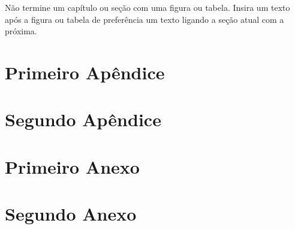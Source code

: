 \documentclass[
    12pt,				       %
    openright,			       %
    oneside,			       %
    a4paper,			       %
    chapter=TITLE,             %
    sumario=tradicional,       %
    english,			        %
    brazil, 				    %
 ]{abntex2}
\begin{document}
Não termine um capítulo ou seção com uma figura ou tabela. Insira um texto após a figura ou tabela de preferência um texto ligando a seção atual com a próxima.


\postextual


\thispagestyle{empty}




\begin{apendicesenv} \thispagestyle{empty}
    \partapendices %

    \chapter{Primeiro Apêndice} \thispagestyle{empty}

    \chapter{Segundo Apêndice} \thispagestyle{empty}
\end{apendicesenv}

\begin{anexosenv}
    \partanexos %

    \chapter{Primeiro Anexo} \thispagestyle{empty}

    \chapter{Segundo Anexo} \thispagestyle{empty}
\end{anexosenv}
\end{document}

